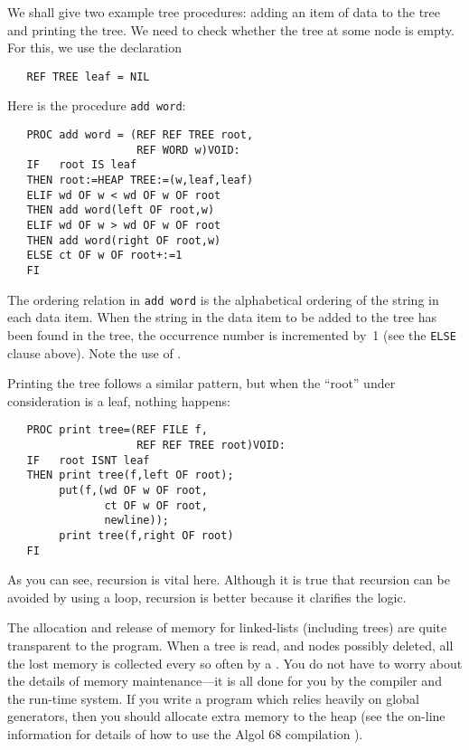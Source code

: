 We shall give two example tree procedures: adding an item of data to
the tree and printing the tree. We need to check whether the tree at
some node is empty. For this, we use the declaration
\begin{verbatim}
   REF TREE leaf = NIL
\end{verbatim}
\noindent
Here is the procedure \verb|add word|:
\begin{verbatim}
   PROC add word = (REF REF TREE root,
                    REF WORD w)VOID:
   IF   root IS leaf
   THEN root:=HEAP TREE:=(w,leaf,leaf)
   ELIF wd OF w < wd OF w OF root
   THEN add word(left OF root,w)
   ELIF wd OF w > wd OF w OF root
   THEN add word(right OF root,w)
   ELSE ct OF w OF root+:=1
   FI
\end{verbatim}
\noindent
The ordering relation in \verb|add word| is the alphabetical ordering
of the string in each data item. When the string in the data item to be
added to the tree has been found in the tree, the occurrence number is
incremented by~1 (see the \verb|ELSE| clause above).
Note the use of .

Printing the tree follows a similar pattern, but when the ``root'' under
consideration is a leaf, nothing happens:
\begin{verbatim}
   PROC print tree=(REF FILE f,
                    REF REF TREE root)VOID:
   IF   root ISNT leaf
   THEN print tree(f,left OF root);
        put(f,(wd OF w OF root,
               ct OF w OF root,
               newline));
        print tree(f,right OF root)
   FI
\end{verbatim}
\noindent
As you can see, recursion is vital here. Although it is true that
recursion can be avoided by using a loop, recursion is better because
it clarifies the logic.

The allocation and release of memory for linked-lists (including
trees) are quite transparent to the program.  When a tree is read,
and nodes possibly deleted, all the lost memory is collected every so
often by a .  You do not have to worry about
the details of memory maintenance---it is all done for you by the
compiler and the run-time system.  If you write a program which
relies heavily on global generators, then you should allocate extra
memory to the heap (see the on-line information for details of how to
use the Algol 68 compilation ).

